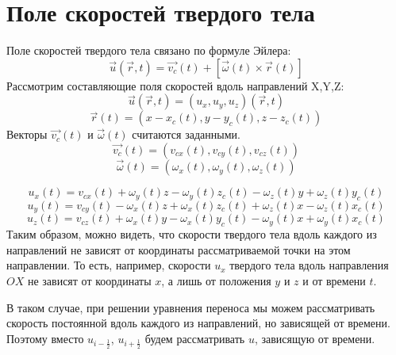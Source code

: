 \documentclass[10pt,a4paper]{article}
\begin{document}
\section{Поле скоростей твердого тела}
Поле скоростей твердого тела связано по формуле Эйлера:
\[
\overrightarrow{u}(\overrightarrow{r},t)=\overrightarrow{v_c}(t)+[\overrightarrow{\omega}(t)\times \overrightarrow{r}(t)]
\]
Рассмотрим составляющие поля скоростей вдоль направлений X,Y,Z:
\[ \overrightarrow{u}(\overrightarrow{r},t)=(u_x, u_y, u_z)(\overrightarrow{r},t) \]
\[ \overrightarrow{r}(t)=(x-x_c(t), y-y_c(t), z-z_c(t)) \]
Векторы $\overrightarrow{v_c}(t)$ и $\overrightarrow{\omega}(t)$ считаются заданными.
\[ \overrightarrow{v_c}(t)=(v_{cx}(t), v_{cy}(t), v_{cz}(t)) \]
\[ \overrightarrow{\omega}(t)=(\omega_x(t), \omega_y(t), \omega_z(t)) \]

\[ u_x(t)=v_{cx}(t)+\omega_y(t)z-\omega_y(t)z_c(t)-\omega_z(t)y+\omega_z(t)y_c(t) \]
\[ u_y(t)=v_{cy}(t)-\omega_x(t)z+\omega_x(t)z_c(t)+\omega_z(t)x-\omega_z(t)x_c(t) \]
\[ u_z(t)=v_{cz}(t)+\omega_x(t)y-\omega_x(t)y_c(t)-\omega_y(t)x+\omega_y(t)x_c(t) \]
Таким образом, можно видеть, что скорости твердого тела вдоль каждого из направлений не зависят от координаты рассматриваемой точки на этом направлении. То есть, например, скорости $u_x$ твердого тела вдоль направления $OX$ не зависят от координаты $x$, а лишь от положения $y$ и $z$ и от времени $t$.

В таком случае, при решении уравнения переноса мы можем рассматривать скорость постоянной вдоль каждого из направлений, но зависящей от времени. Поэтому вместо $u_{i-\frac{1}{2}}$, $u_{i+\frac{1}{2}}$ будем рассматривать $u$, зависящую от времени.
\end{document}
